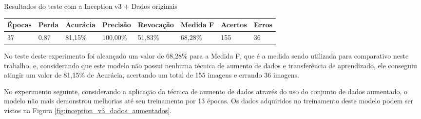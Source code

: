 \documentclass[
	12pt,				%
	oneside,			%
	a4paper,			%
	english,			%
	brazil				%
	]{abntex2ppgsi}
\begin{document}
\begin{quadro}[H]
\caption{Resultados do teste com a Inception v3 + Dados originais}
\label{quad:resultados_teste_inception_v3_com_dados_originais}
\centering
\begin{tabular}{|l|l|l|l|l|l|l|l|}
\cline{1-8}
Épocas & Perda & Acurácia & Precisão & Revocação & Medida F & Acertos & Erros \\ \hline
37 & 0,87 & 81,15\% & 100,00\% & 51,83\% & 68,28\% & 155 & 36 \\
\cline{1-8}
\end{tabular}
\end{quadro}

No teste deste experimento foi alcançado um valor de 68,28\% para a Medida F, que é a medida sendo utilizada para comparativo neste trabalho, e, considerando que este modelo não possui nenhuma técnica de aumento de dados e transferência de aprendizado, ele conseguiu atingir um valor de 81,15\% de Acurácia, acertando um total de 155 imagens e errando 36 imagens.

No experimento seguinte, considerando a aplicação da técnica de aumento de dados através do uso do conjunto de dados aumentado, o modelo não mais demonstrou melhorias até seu treinamento por 13 épocas. Os dados adquiridos no treinamento deste modelo podem ser vistos na Figura \ref{fig:inception_v3_dados_aumentados}.
\end{document}
